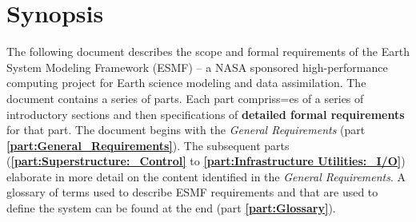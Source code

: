 \section{Synopsis}

The following document describes the scope and formal requirements
of the Earth System Modeling Framework (ESMF) -- a NASA sponsored 
high-performance computing project for Earth science modeling and 
data assimilation. The document contains a series of parts.
Each part compriss=es of a series of introductory
sections and then specifications of {\bf detailed formal requirements}
for that part. The document begins with the {\it General Requirements}
(part {\bf \ref{part:General_Requirements}}). The subsequent parts 
({\bf \ref{part:Superstructure:_Control}} to {\bf \ref{part:Infrastructure Utilities:_I/O}})
elaborate in more detail on the content identified in
the {\it General Requirements}.
A glossary
of terms used to describe ESMF requirements and that are used
to define the system can be found at the end (part {\bf \ref{part:Glossary}}).







